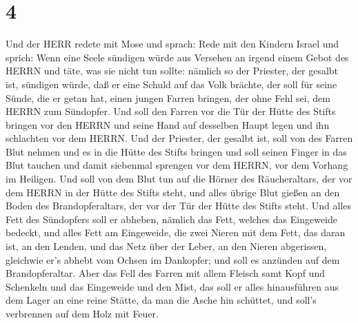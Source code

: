 \hypertarget{section-3}{%
\section{4}\label{section-3}}

 Und der HERR redete mit Mose und sprach:  Rede
mit den Kindern Israel und sprich: Wenn eine Seele sündigen würde aus
Versehen an irgend einem Gebot des HERRN und täte, was sie nicht tun
sollte:  nämlich so der Priester, der gesalbt ist, sündigen
würde, daß er eine Schuld auf das Volk brächte, der soll für seine
Sünde, die er getan hat, einen jungen Farren bringen, der ohne Fehl sei,
dem HERRN zum Sündopfer.  Und soll den Farren vor die Tür
der Hütte des Stifts bringen vor den HERRN und seine Hand auf desselben
Haupt legen und ihn schlachten vor dem HERRN.  Und der
Priester, der gesalbt ist, soll von des Farren Blut nehmen und es in die
Hütte des Stifts bringen  und soll seinen Finger in das Blut
tauchen und damit siebenmal sprengen vor dem HERRN, vor dem Vorhang im
Heiligen.  Und soll von dem Blut tun auf die Hörner des
Räucheraltars, der vor dem HERRN in der Hütte des Stifts steht, und
alles übrige Blut gießen an den Boden des Brandopferaltars, der vor der
Tür der Hütte des Stifts steht.  Und alles Fett des
Sündopfers soll er abheben, nämlich das Fett, welches das Eingeweide
bedeckt, und alles Fett am Eingeweide,  die zwei Nieren mit
dem Fett, das daran ist, an den Lenden, und das Netz über der Leber, an
den Nieren abgerissen,  gleichwie er's abhebt vom Ochsen im
Dankopfer; und soll es anzünden auf dem Brandopferaltar. 
Aber das Fell des Farren mit allem Fleisch samt Kopf und Schenkeln und
das Eingeweide und den Mist,  das soll er alles
hinausführen aus dem Lager an eine reine Stätte, da man die Asche hin
schüttet, und soll's verbrennen auf dem Holz mit Feuer.

